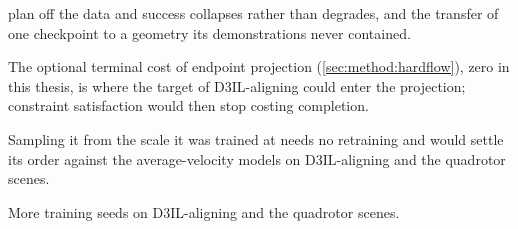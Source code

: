 \begin{description}
    plan off the data and success collapses rather than degrades, and the transfer of one checkpoint to
    a geometry its demonstrations never contained.
  \item[The alignment target.] The optional terminal cost of endpoint projection
    (\autoref{sec:method:hardflow}), zero in this thesis, is where the target of D3IL-aligning could
    enter the projection; constraint satisfaction would then stop costing completion.
  \item[The sampler of instantaneous-velocity matching.] Sampling it from the scale it was trained at
    needs no retraining and would settle its order against the average-velocity models on
    D3IL-aligning and the quadrotor scenes.
  \item[Seeds.] More training seeds on D3IL-aligning and the quadrotor scenes.
\end{description}
